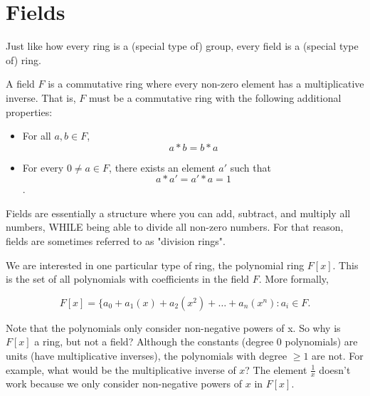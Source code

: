 \section{Fields}

\hspace{\parindent}Just like how every ring is a (special type of) group, every field is a (special type of) ring. 

\begin{definition}
A field $F$ is a commutative ring where every non-zero element has a multiplicative inverse. That is, $F$ must be a commutative ring with the following additional properties:

\begin{itemize}
    \item For all $a,b\in F$, $$a*b = b*a$$
    \item For every $0\neq a \in F$, there exists an element $a'$ such that $$a*a' = a'*a = 1$$.
\end{itemize}
\end{definition}

Fields are essentially a structure where you can add, subtract, and multiply all numbers, WHILE being able to divide all non-zero numbers. For that reason, fields are sometimes referred to as  "division rings".

We are interested in one particular type of ring, the polynomial ring ${F}[x]$. This is the set of all polynomials with coefficients in the field $F$. More formally, 

$$F[x] = \{a_0 + a_1(x) + a_2(x^2) + \dots + a_n(x^n): a_i \in F.$$

Note that the polynomials only consider non-negative powers of x.
So why is $F[x]$ a ring, but not a field? Although the constants (degree 0 polynomials) are units (have multiplicative inverses), the polynomials with degree $\geq1$ are not. For example, what would be the multiplicative inverse of $x$? The element $\frac{1}{x}$ doesn't work because we only consider non-negative powers of $x$ in $F[x]$. 

